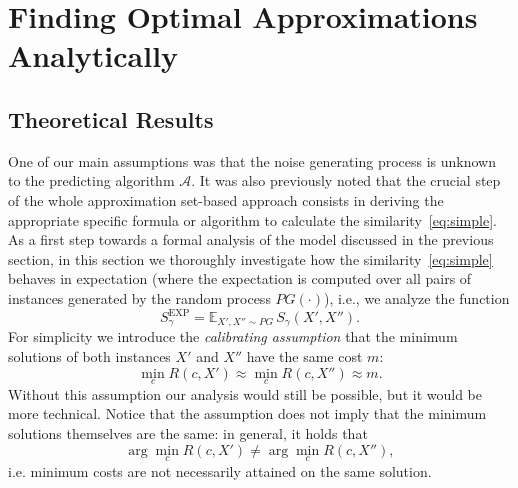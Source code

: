 \section{Finding Optimal Approximations Analytically}
\label{sec:analytic_solution}

\subsection{Theoretical Results}

One of our main assumptions was that the noise generating process is unknown to
the predicting algorithm $\mathscr{A}$. It was also previously noted that the
crucial step of the whole approximation set-based approach consists in deriving
the appropriate specific formula or algorithm to calculate the
similarity~\eqref{eq:simple}. As a first step towards a formal analysis of the
model discussed in the previous section, in this section we thoroughly
investigate how the similarity~\eqref{eq:simple} behaves in expectation (where
the expectation is computed over all pairs of instances generated by the random
process $PG(\cdot)$), i.e., we analyze the function
\begin{equation}
  \label{eq:oracle_similarity}
  S_\gamma^{\mathrm{EXP}}=\mathbb{E}_{X',X''\sim PG} \,
    S_\gamma(X',X'').
\end{equation}
For simplicity we introduce the \emph{calibrating assumption} that the minimum
solutions of both instances $X'$ and $X''$ have the same cost $m$:
\begin{equation}\label{eq:gen_appch_calibrating_assumption}
  \min_c R(c, X') \approx \min_c R(c, X'') \approx m.
\end{equation} 
Without this assumption our analysis would still be possible, but it would be
more technical. Notice that the assumption does not imply that the minimum
solutions themselves are the same: in general, it holds that
\begin{equation}
   \arg \min_c R(c, X') \ne \arg \min_c R(c, X''),
\end{equation} 
i.e. minimum costs are not necessarily attained on the same solution.

